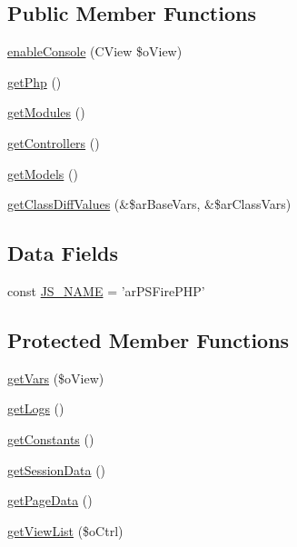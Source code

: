 \subsection*{Public Member Functions}
\begin{DoxyCompactItemize}
\item 
\hyperlink{classCPSFirePHP_af917e8d00ffa6599a9bf4ca8c6161cb3}{enableConsole} (CView \$oView)
\item 
\hyperlink{classCPSFirePHP_ac65c2555c09638bb6abc022401d1e0ba}{getPhp} ()
\item 
\hyperlink{classCPSFirePHP_adabf9c48e2c9bf149be4738eea4d84e7}{getModules} ()
\item 
\hyperlink{classCPSFirePHP_a57e4cfe772218ab32bf592036147f759}{getControllers} ()
\item 
\hyperlink{classCPSFirePHP_a85257a6026e75945f9e50ece1077c10c}{getModels} ()
\item 
\hyperlink{classCPSFirePHP_a34865cf7d06a92175b0761b7701256b7}{getClassDiffValues} (\&\$arBaseVars, \&\$arClassVars)
\end{DoxyCompactItemize}
\subsection*{Data Fields}
\begin{DoxyCompactItemize}
\item 
const \hyperlink{classCPSFirePHP_a1ae5abc3ad17654100e3ade1df460965}{JS\_\-NAME} = 'arPSFirePHP'
\end{DoxyCompactItemize}
\subsection*{Protected Member Functions}
\begin{DoxyCompactItemize}
\item 
\hyperlink{classCPSFirePHP_ab7d4c42aded424959efc81e998a00992}{getVars} (\$oView)
\item 
\hyperlink{classCPSFirePHP_a5a1b761c901432b2bfd7fc4e5e75a6bd}{getLogs} ()
\item 
\hyperlink{classCPSFirePHP_a37357ff7fe8d1c1ea764fa1465637543}{getConstants} ()
\item 
\hyperlink{classCPSFirePHP_a74b1f507d455e4500e8a96432953b59e}{getSessionData} ()
\item 
\hyperlink{classCPSFirePHP_a0d26c06309c3dc68c3f035e423549d8c}{getPageData} ()
\item 
\hyperlink{classCPSFirePHP_a4f658740c9bd4a333fa84fdc90538d97}{getViewList} (\$oCtrl)
\end{DoxyCompactItemize}


